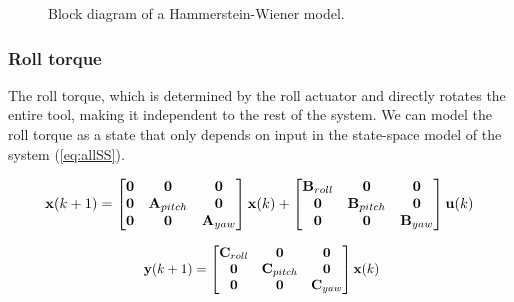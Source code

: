 \begin{figure}[h] 
\caption{Block diagram of a Hammerstein-Wiener model.}
\label{fig:weiner}
\end{figure}

\subsubsection{Roll torque}
The roll torque, which is determined by the roll actuator and directly rotates the entire tool, making it independent to the rest of the system.
We can model the roll torque as a state that only depends on input in the state-space model of the system (\ref{eq:allSS}).



\begin{equation}\label{eq:allSS}
\resizebox{0.91\hsize}{!}{
$\mathbf{x}(k+1) = 
\begin{bmatrix} \mathbf{0} & \mathbf{0} & \mathbf{0}\\
\mathbf{0} & \mathbf{A}_{pitch} &\mathbf{0}\\
\mathbf{0} &\mathbf{0} & \mathbf{A}_{yaw}  \end{bmatrix} 
\mathbf{x}(k) + 
\begin{bmatrix} \mathbf{B}_{roll} & \mathbf{0} & \mathbf{0}\\
\mathbf{0} & \mathbf{B}_{pitch} &\mathbf{0}\\
\mathbf{0} &\mathbf{0} & \mathbf{B}_{yaw}  \end{bmatrix} 
\mathbf{u}(k)$
}
\end{equation}

\begin{equation}\label{eq:allSS2}
\resizebox{0.5\hsize}{!}{
	$\mathbf{y}(k+1) = 
	\begin{bmatrix} \mathbf{C}_{roll} & \mathbf{0} & \mathbf{0}\\
	\mathbf{0} & \mathbf{C}_{pitch} &\mathbf{0}\\
	\mathbf{0} &\mathbf{0} & \mathbf{C}_{yaw}  \end{bmatrix} 
	\mathbf{x}(k) $}
\end{equation}

